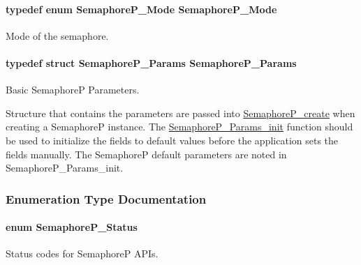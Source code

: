 \paragraph[{Semaphore\+P\+\_\+\+Mode}]{\setlength{\rightskip}{0pt plus 5cm}typedef enum {\bf Semaphore\+P\+\_\+\+Mode}  {\bf Semaphore\+P\+\_\+\+Mode}}\label{_semaphore_p_8h_a1c637322a42ff17a900127069a8c441a}


Mode of the semaphore. 

\paragraph[{Semaphore\+P\+\_\+\+Params}]{\setlength{\rightskip}{0pt plus 5cm}typedef struct {\bf Semaphore\+P\+\_\+\+Params}  {\bf Semaphore\+P\+\_\+\+Params}}\label{_semaphore_p_8h_a83120723ac10a70459fabc2093ac18f9}


Basic Semaphore\+P Parameters. 

Structure that contains the parameters are passed into \hyperlink{_semaphore_p_8h_a3fd837348befa046554496e8da2a1fac}{Semaphore\+P\+\_\+create} when creating a Semaphore\+P instance. The \hyperlink{_semaphore_p_8h_a5a2deea3033e8a6aa2564637958efd02}{Semaphore\+P\+\_\+\+Params\+\_\+init} function should be used to initialize the fields to default values before the application sets the fields manually. The Semaphore\+P default parameters are noted in Semaphore\+P\+\_\+\+Params\+\_\+init. 

\subsubsection{Enumeration Type Documentation}
\paragraph[{Semaphore\+P\+\_\+\+Status}]{\setlength{\rightskip}{0pt plus 5cm}enum {\bf Semaphore\+P\+\_\+\+Status}}\label{_semaphore_p_8h_a5d4aebe0ebff4aaadba07d853ae4ee42}


Status codes for Semaphore\+P A\+P\+Is. 


